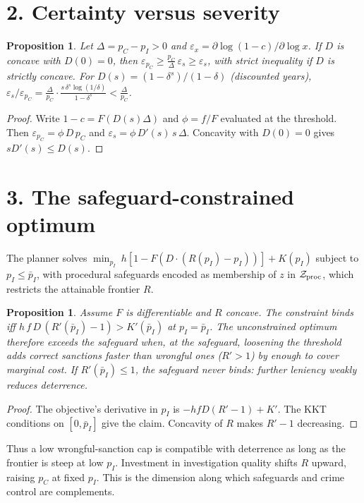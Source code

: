 \documentclass[11pt]{article}
\newtheorem{proposition}[theorem]{Proposition}
\theoremstyle{definition}
\begin{document}
\section*{2. Certainty versus severity}
\begin{proposition}\label{prop:cert}
Let $\Delta=p_C-p_I>0$ and $\varepsilon_x=\partial\log(1-c)/\partial\log x$. If $D$ is concave with $D(0)=0$, then
$\varepsilon_{p_C}\ge\frac{p_C}{\Delta}\,\varepsilon_s\ge\varepsilon_s$, with strict inequality if $D$ is strictly concave.
For $D(s)=(1-\delta^s)/(1-\delta)$ (discounted years),
$\varepsilon_s/\varepsilon_{p_C}=\frac{\Delta}{p_C}\cdot\frac{s\,\delta^s\log(1/\delta)}{1-\delta^s}<\frac{\Delta}{p_C}$.
\end{proposition}
\begin{proof}
Write $1-c=F(D(s)\Delta)$ and $\phi=f/F$ evaluated at the threshold. Then
$\varepsilon_{p_C}=\phi\,D\,p_C$ and $\varepsilon_s=\phi\,D'(s)\,s\,\Delta$. Concavity with $D(0)=0$ gives $sD'(s)\le D(s)$.
\end{proof}

\section*{3. The safeguard-constrained optimum}
The planner solves $\min_{p_I}\ h[1-F(D\cdot(R(p_I)-p_I))]+K(p_I)$ subject to $p_I\le\bar p_I$, with procedural
safeguards encoded as membership of $z$ in $\mathcal Z_{\rm proc}$, which restricts the attainable frontier $R$.
\begin{proposition}\label{prop:kkt}
Assume $F$ is differentiable and $R$ concave. The constraint binds iff
$h\,f\,D\,(R'(\bar p_I)-1)>K'(\bar p_I)$ at $p_I=\bar p_I$. The unconstrained optimum therefore exceeds the safeguard
when, at the safeguard, loosening the threshold adds correct sanctions faster than wrongful ones ($R'>1$) by enough to
cover marginal cost. If $R'(\bar p_I)\le1$, the safeguard never binds: further leniency weakly reduces deterrence.
\end{proposition}
\begin{proof}
The objective's derivative in $p_I$ is $-hfD(R'-1)+K'$. The KKT conditions on $[0,\bar p_I]$ give the claim. Concavity of
$R$ makes $R'-1$ decreasing.
\end{proof}
Thus a low wrongful-sanction cap is compatible with deterrence as long as the frontier is steep at low $p_I$. Investment
in investigation quality shifts $R$ upward, raising $p_C$ at fixed $p_I$. This is the dimension along which safeguards and
crime control are complements.
\end{document}
